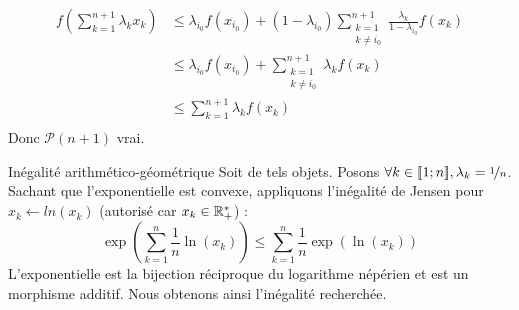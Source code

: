 \documentclass{article}
\begin{document}
\begin{question_kholle}
\begin{itemize}[label=*, leftmargin=0.5cm]
		      \begin{equation*}
			      \begin{aligned}
				      f\left( \sum_{k=1}^{n+1} \lambda_k x_k \right)
				       & \leqslant \lambda_{i_0} f(x_{i_0}) + \left( 1 - \lambda_{i_0} \right) \sum_{\begin{array}{c} k = 1 \\ k \neq i_0 \end{array}}^{n+1} \frac{\lambda_k}{1 - \lambda_{i_0}} f\left( x_k \right) \\
				       & \leqslant \lambda_{i_0} f(x_{i_0}) + \sum_{\begin{array}{c} k = 1 \\ k \neq i_0 \end{array}}^{n+1} \lambda_k f\left( x_k \right)                                                            \\
				       & \leqslant \sum_{k = 1}^{n+1} \lambda_k f\left( x_k \right)                                                                                                                                  \\
			      \end{aligned}
		      \end{equation*}
		      Donc $\mathcal{P}(n+1)$ vrai.
	\end{itemize}
\end{question_kholle}

\begin{question_kholle}
	[Soit $n \in \N^*$. Soit $x \in \R_+^{*n}$.
		\begin{equation}
			\left( \prod_{k=1}^{n} x_k \right)^{\nicefrac{1}{n}}
			\leqslant \frac{1}{n} \sum_{k=1}^{n} x_k
		\end{equation}]
	{Inégalité arithmético-géométrique}
	Soit de tels objets. Posons $\forall k \in [\![1;n]\!], \lambda_k = \nicefrac{1}{n}$. \\
	Sachant que l'exponentielle est convexe, appliquons l'inégalité de Jensen pour $x_k \leftarrow ln(x_k)$ (autorisé car $x_k \in \mathbb R_+^*$) :
	\begin{equation*}
		\exp \left( \sum_{k=1}^{n} \frac{1}{n} \ln \left( x_k \right) \right)
		\leqslant \sum_{k=1}^{n} \frac{1}{n} \exp \left( \ln \left( x_k \right) \right)
	\end{equation*}
	L'exponentielle est la bijection réciproque du logarithme népérien et est un morphisme additif. Nous obtenons ainsi l'inégalité recherchée.
\end{question_kholle}
\end{document}
